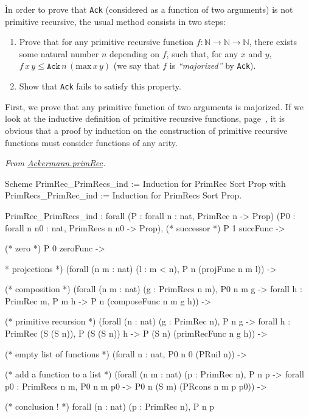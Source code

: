 Ìn order to prove that \texttt{Ack} (considered as a function of two arguments) is not primitive recursive, the usual method consists in two steps:


\begin{enumerate}
\item Prove that for any primitive recursive function $f:\mathbb{N}\rightarrow\mathbb{N}\rightarrow\mathbb{N}$, there exists some natural number $n$ depending on $f$, such that, for any $x$ and $y$, 
$f\,x\,y \leq \texttt{Ack}\,n\,(\textrm{max}\,x\,y)$ (we say that $f$ is \emph{``majorized''}  by \texttt{Ack}).
\item Show that \texttt{Ack} fails to satisfy this property.
\end{enumerate}

First, we prove that any primitive function of two arguments is majorized.
If we look at the inductive definition of primitive recursive functions, page~\pageref{def:Primrec}, it is obvious that a proof by induction on the construction of primitive recursive functions must consider functions of any arity.

\vspace{4pt}
\noindent
\emph{From \href{../theories/html/hydras.Ackermann.primRec.html}{Ackermann.primRec}.}

\begin{Coqsrc}
Scheme PrimRec_PrimRecs_ind := Induction for PrimRec
  Sort Prop
  with PrimRecs_PrimRec_ind := Induction for PrimRecs 
  Sort Prop.
\end{Coqsrc}

\begin{Coqanswer}
PrimRec_PrimRecs_ind :
forall (P : forall n : nat, PrimRec n -> Prop)
  (P0 : forall n n0 : nat, PrimRecs n n0 -> Prop),
(* successor *)
P 1 succFunc ->

(* zero *)
P 0 zeroFunc ->

* projections *)
(forall (n m : nat) (l : m < n), P n (projFunc n m l)) ->

(* composition *) 
(forall (n m : nat) (g : PrimRecs n m),
      P0 n m g -> forall h : PrimRec m, P m h -> 
      P n (composeFunc n m g h)) ->

(* primitive recursion *)
(forall (n : nat) (g : PrimRec n),
 P n g ->
    forall h : PrimRec (S (S n)), P (S (S n)) h -> 
     P (S n) (primRecFunc n g h)) ->

(* empty list of functions *)
(forall n : nat, P0 n 0 (PRnil n)) ->

(* add a function to a list *)
(forall (n m : nat) (p : PrimRec n),
   P n p -> 
   forall p0 : PrimRecs n m, P0 n m p0 -> 
   P0 n (S m) (PRcons n m p p0)) ->

(* conclusion ! *)
forall (n : nat) (p : PrimRec n), P n p
\end{Coqanswer}

